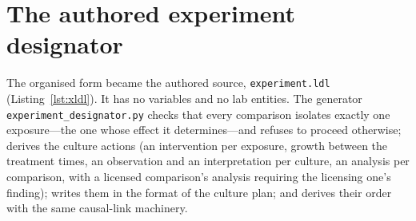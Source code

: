 \documentclass[10pt,a4paper]{article}
\begin{document}
\section{The authored experiment designator}\label{sec:authored}
The organised form became the authored source, \texttt{experiment.ldl} (Listing~\ref{lst:xldl}). It has no
variables and no lab entities. The generator \texttt{experiment\_\allowbreak{}designator.py} checks that every comparison isolates
exactly one exposure---the one whose effect it determines---and refuses to proceed otherwise; derives the culture
actions (an intervention per exposure, growth between the treatment times, an observation and an interpretation per
culture, an analysis per comparison, with a licensed comparison's analysis requiring the licensing one's finding);
writes them in the format of the culture plan; and derives their order with the same causal-link machinery.
\end{document}
